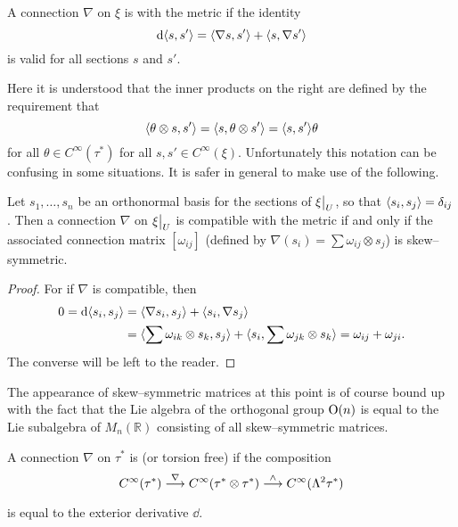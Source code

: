 \documentclass[../main]{subfiles}
\begin{document}
\begin{definition}
A connection $\nabla$ on $\xi$ is  with the metric if the identity \[\mathrm{d} \langle s,s'\rangle = \langle\nabla s,s'\rangle + \langle s,\nabla s'\rangle\] is valid for all sections $s$ and $s'$. 
\end{definition}

Here it is understood that the inner products on the right are defined by the requirement that \[\langle\theta \otimes s,s'\rangle = \langle s,\theta \otimes s'\rangle = \langle s,s'\rangle \theta\] for all $\theta \in C^\infty(\tau^\ast)$ for all $s, s' \in C^\infty(\xi)$. Unfortunately this notation can be confusing in some situations. It is safer in general to make use of the following. 

\begin{lemma}
Let $s_1, \ldots, s_n$ be an orthonormal basis for the sections of $\xi \big{|}_U$, so that $\langle s_i,s_j\rangle = \delta_{ij}$. Then a connection $\nabla$ on $\xi \big{|}_U$ is compatible with the metric if and only if the associated connection matrix $[\omega_{ij}]$ (defined by $\displaystyle \nabla(s_i) = \sum \omega_{ij} \otimes s_j$) is skew--symmetric. 
\end{lemma}

\begin{proof}
For if $\nabla$ is compatible, then 
\begin{align*}
0 = \mathrm{d} \langle s_i,s_j\rangle & = \langle\nabla s_i,s_j\rangle + \langle s_i,\nabla s_j\rangle \\ & = \langle\sum \omega_{ik} \otimes s_k,s_j\rangle + \langle s_i,\sum \omega_{jk} \otimes s_k\rangle = \omega_{ij} + \omega_{ji}.
\end{align*}
The converse will be left to the reader.
\end{proof}

\begin{remark*}
The appearance of skew--symmetric matrices at this point is of course bound up with the fact that the Lie algebra of the orthogonal group $\operatorname{O}(n)$ is equal to the Lie subalgebra of $M_n(\mathbb R)$ consisting of all skew--symmetric matrices. 
\end{remark*} 

\begin{definition}
A connection $\nabla$ on $\tau^\ast$ is  (or torsion free) if the composition \[C^\infty(\tau^\ast) \varrightarrow{\nabla} C^\infty(\tau^\ast \otimes \tau^\ast) \varrightarrow{\wedge} C^\infty(\Lambda^2 \tau^\ast)\] is equal to the exterior derivative $\dd$. 
\end{definition}
\end{document}
